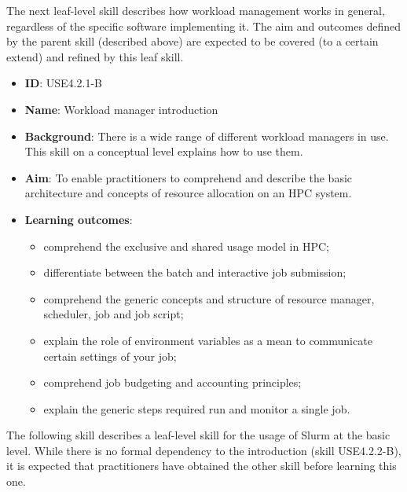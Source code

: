 \documentclass[jocse]{jocseart}
\begin{document}
The next leaf-level skill describes how workload management works in general, regardless of the specific software implementing it. 
The aim and outcomes defined by the parent skill (described above) are expected to be covered (to a certain extend) and refined by this leaf skill.

\begin{itemize}
  \item \textbf{ID}: USE4.2.1-B
  \item \textbf{Name}: Workload manager introduction
  \item \textbf{Background}: There is a wide range of different workload managers in use. This skill on a conceptual level explains how to use them.
  \item \textbf{Aim}: To enable practitioners to comprehend and describe the basic architecture and concepts of resource allocation on an HPC system.
  \item \textbf{Learning outcomes}:

  \begin{itemize}
  \item comprehend the exclusive and shared usage model in HPC;
  \item differentiate between the batch and interactive job submission;
  \item comprehend the generic concepts and structure of resource manager, scheduler, job and job script;
  \item explain the role of environment variables as a mean to communicate certain settings of your job;  
  \item comprehend job budgeting and accounting principles;
  \item explain the generic steps required run and monitor a single job.
  \end{itemize}
\end{itemize}


The following skill describes a leaf-level skill for the usage of Slurm at the basic level.
While there is no formal dependency to the introduction (skill USE4.2.2-B), it is expected that practitioners have obtained the other skill before learning this one.
\end{document}
